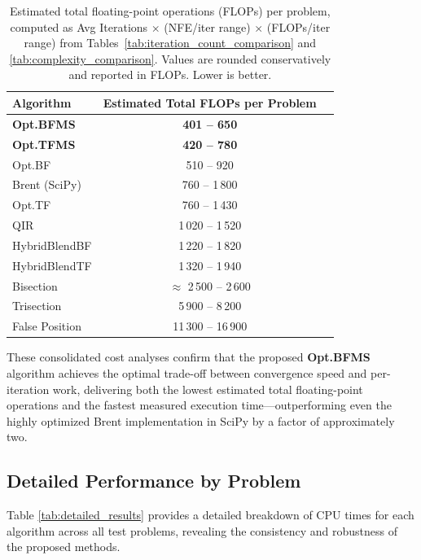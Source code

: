 \documentclass[amsmath, amssymb, aps]{revtex4-2}
\begin{document}
\begin{table}[H]
\centering
\caption{Estimated total floating-point operations (FLOPs) per problem, computed as Avg Iterations $\times$ (NFE/iter range) $\times$ (FLOPs/iter range) from Tables~\ref{tab:iteration_count_comparison} and \ref{tab:complexity_comparison}. Values are rounded conservatively and reported in FLOPs. Lower is better.}
\label{tab:total_flops}
\begin{tabular}{lcr}
\hline
Algorithm                & Estimated Total FLOPs per Problem \\
\hline
\textbf{Opt.BFMS}        & \textbf{401 -- 650} \\
\textbf{Opt.TFMS}        & \textbf{420 -- 780} \\
Opt.BF                   & 510 -- 920 \\
Brent (SciPy)            & 760 -- 1\,800 \\
Opt.TF                   & 760 -- 1\,430 \\
QIR                      & 1\,020 -- 1\,520 \\
HybridBlendBF            & 1\,220 -- 1\,820 \\
HybridBlendTF            & 1\,320 -- 1\,940 \\
Bisection                & $\approx$ 2\,500 -- 2\,600 \\
Trisection               & 5\,900 -- 8\,200 \\
False Position           & 11\,300 -- 16\,900 \\
\hline
\end{tabular}
\end{table}
\FloatBarrier

These consolidated cost analyses confirm that the proposed \textbf{Opt.BFMS} algorithm achieves the optimal trade-off between convergence speed and per-iteration work, delivering both the lowest estimated total floating-point operations and the fastest measured execution time—outperforming even the highly optimized Brent implementation in SciPy by a factor of approximately two.

\subsection{Detailed Performance by Problem}

Table \ref{tab:detailed_results} provides a detailed breakdown of CPU times for each algorithm across all test problems, revealing the consistency and robustness of the proposed methods.
\end{document}
